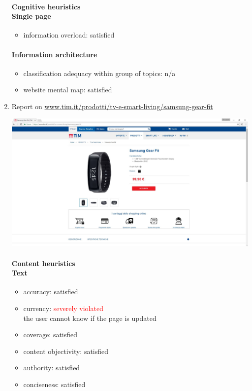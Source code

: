 \begin{enumerate}
	\paragraph*{Cognitive heuristics \\ Single page}
	\begin{itemize}
		\item information overload: satisfied
	\end{itemize}	

	\paragraph*{Information architecture}
	\begin{itemize}
		\item classification adequacy within group of topics: n/a
		\item website mental map: satisfied
	\end{itemize}
\newpage


\item Report on \url{www.tim.it/prodotti/tv-e-smart-living/samsung-gear-fit}

\begin{center}
	\includegraphics[width=\textwidth]{Screenshot/gear.jpg}
\end{center}
\vspace{1cm}

	\paragraph*{Content heuristics \\ Text}
	\begin{itemize}
		\item accuracy: satisfied
		\item currency: \textcolor{red}{severely violated}\\
		the user cannot know if the page is updated
		\item coverage: satisfied
		\item content objectivity: satisfied
		\item authority: satisfied
		\item conciseness: satisfied		
	\end{itemize}


\end{enumerate}

